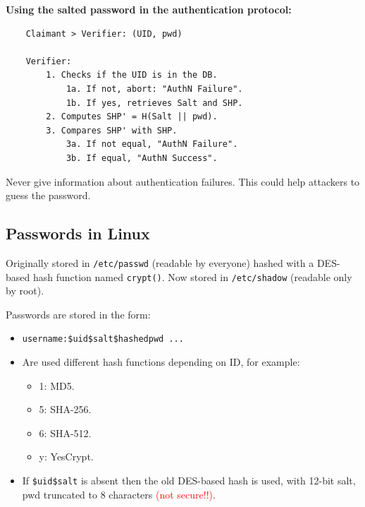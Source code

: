 \vspace{0.3cm}

\begin{center}
    \textbf{Using the salted password in the authentication protocol:}
\end{center}
\begin{verbatim}
    Claimant > Verifier: (UID, pwd)

    Verifier:
        1. Checks if the UID is in the DB.
            1a. If not, abort: "AuthN Failure".
            1b. If yes, retrieves Salt and SHP.
        2. Computes SHP' = H(Salt || pwd).
        3. Compares SHP' with SHP.
            3a. If not equal, "AuthN Failure".
            3b. If equal, "AuthN Success".
\end{verbatim}

\begin{tcolorbox}[colback=red!10!white, colframe=red!70!black, coltitle=white, title=Beware]
Never give information about authentication failures. This could help attackers to guess the password.
\end{tcolorbox}

\subsection*{Passwords in Linux}
Originally stored in \texttt{/etc/passwd} (readable by everyone) hashed with a DES-based hash function named \texttt{crypt()}. Now stored in \texttt{/etc/shadow} (readable only by root).

\vspace{0.2cm}

Passwords are stored in the form:
\begin{itemize}
    \item \texttt{username:\$uid\$salt\$hashedpwd ...}
    \item Are used different hash functions depending on ID, for example:
    \begin{itemize}
        \item 1: MD5.
        \item 5: SHA-256.
        \item 6: SHA-512.
        \item y: YesCrypt.
    \end{itemize}
    \item If \texttt{\$uid\$salt} is absent then the old DES-based hash is used, with 12-bit salt, pwd truncated to 8 characters \textcolor{Red}{(not secure!!)}.
\end{itemize}


